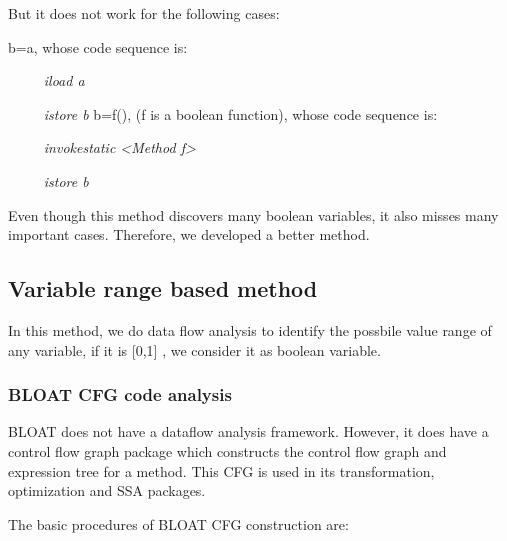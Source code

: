 But it does not work for the following cases:

b=a, whose code sequence is:

\emph{~~~~~iload a}

\emph{~~~~~istore b}
b=f(), (f is a boolean function), whose code sequence is:

\emph{~~~~~invokestatic <Method f>}

\emph{~~~~~istore b}

Even though this method discovers many boolean variables, it also
misses many important cases.  Therefore, we developed a better method.


\subsection{Variable range based method}

In this method, we do data flow analysis to identify the possbile
value range of any variable, if it is {[}0,1{]} , we consider it as
boolean variable.


\subsubsection{BLOAT CFG code analysis}

BLOAT does not have a dataflow analysis framework. However, it does have a
control flow graph package which constructs the control flow graph
and expression tree for a method. This CFG is used in its transformation,
optimization and SSA packages.

The basic procedures of BLOAT CFG construction are:

